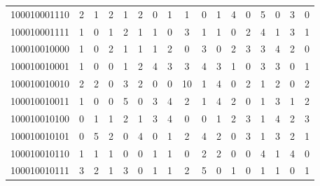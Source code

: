 \documentclass[10pt,a4paper]{article}
\begin{document}
\begin{longtable}{ |c|c|c|c|c|c|c|c|c|c|c|c|c|c|c|c|c| }
    100010001110              & 2                            & 1                                & 2                            & 1                              & 2   & 0   & 1   & 1   & 0   & 1   & 4   & 0   & 5   & 0   & 3   & 0   \\
    100010001111              & 1                            & 0                                & 1                            & 2                              & 1   & 1   & 0   & 3   & 1   & 1   & 0   & 2   & 4   & 1   & 3   & 1   \\
    100010010000              & 1                            & 0                                & 2                            & 1                              & 1   & 1   & 2   & 0   & 3   & 0   & 2   & 3   & 3   & 4   & 2   & 0   \\
    100010010001              & 1                            & 0                                & 0                            & 1                              & 2   & 4   & 3   & 3   & 4   & 3   & 1   & 0   & 3   & 3   & 0   & 1   \\
    100010010010              & 2                            & 2                                & 0                            & 3                              & 2   & 0   & 0   & 10  & 1   & 4   & 0   & 2   & 1   & 2   & 0   & 2   \\
    100010010011              & 1                            & 0                                & 0                            & 5                              & 0   & 3   & 4   & 2   & 1   & 4   & 2   & 0   & 1   & 3   & 1   & 2   \\
    100010010100              & 0                            & 1                                & 1                            & 2                              & 1   & 3   & 4   & 0   & 0   & 1   & 2   & 3   & 1   & 4   & 2   & 3   \\
    100010010101              & 0                            & 5                                & 2                            & 0                              & 4   & 0   & 1   & 2   & 4   & 2   & 0   & 3   & 1   & 3   & 2   & 1   \\
    100010010110              & 1                            & 1                                & 1                            & 0                              & 0   & 1   & 1   & 0   & 2   & 2   & 0   & 0   & 4   & 1   & 4   & 0   \\
    100010010111              & 3                            & 2                                & 1                            & 3                              & 0   & 1   & 1   & 2   & 5   & 0   & 1   & 0   & 1   & 1   & 0   & 1   \\

\end{longtable}
\end{document}
